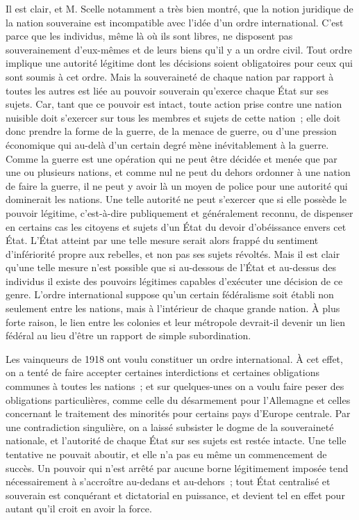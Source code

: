 \documentclass[french,twoside]{book} %
\begin{document}
Il est clair, et M. Scelle notamment a très bien montré, que la notion juridique de la nation souveraine est incompatible avec l'idée d'un ordre inter­national. C'est parce que les individus, même là où ils sont libres, ne disposent pas souverainement d'eux-mêmes et de leurs biens qu'il y a un ordre civil. Tout ordre implique une autorité légitime dont les décisions soient obliga­toires pour ceux qui sont soumis à cet ordre. Mais la souveraineté de chaque nation par rapport à toutes les autres est liée au pouvoir souverain qu'exerce chaque État sur ses sujets. Car, tant que ce pouvoir est intact, toute action prise contre une nation nuisible doit s'exercer sur tous les membres et sujets de cette nation ; elle doit donc prendre la forme de la guerre, de la menace de guerre, ou d'une pression économique qui au-delà d'un certain degré mène inévitablement à la guerre. Comme la guerre est une opération qui ne peut être décidée et menée que par une ou plusieurs nations, et comme nul ne peut du dehors ordonner à une nation de faire la guerre, il ne peut y avoir là un moyen de police pour une autorité qui dominerait les nations. Une telle autorité ne peut s'exercer que si elle possède le pouvoir légitime, c'est-à-dire publique­ment et généralement reconnu, de dispenser en certains cas les citoyens et sujets d'un État du devoir d'obéissance envers cet État. L'État atteint par une telle mesure serait alors frappé du sentiment d'infériorité propre aux rebelles, et non pas ses sujets révoltés. Mais il est clair qu'une telle mesure n'est possible que si au-dessous de l'État et au-dessus des individus il existe des pouvoirs légitimes capables d'exécuter une décision de ce genre. L'ordre international suppose qu'un certain fédéralisme soit établi non seulement entre les nations, mais à l'intérieur de chaque grande nation. À plus forte raison, le lien entre les colonies et leur métropole devrait-il devenir un lien fédéral au lieu d'être un rapport de simple subordination.\par
Les vainqueurs de 1918 ont voulu constituer un ordre international. À cet effet, on a tenté de faire accepter certaines interdictions et certaines obliga­tions communes à toutes les nations ; et sur quelques-unes on a voulu faire peser des obligations particulières, comme celle du désarmement pour l'Alle­magne et celles concernant le traitement des minorités pour certains pays d'Europe centrale. Par une contradiction singulière, on a laissé subsister le dogme de la souveraineté nationale, et l'autorité de chaque État sur ses sujets est restée intacte. Une telle tentative ne pouvait aboutir, et elle n'a pas eu même un commencement de succès. Un pouvoir qui n'est arrêté par aucune borne légitimement imposée tend nécessairement à s'accroître au-dedans et au-dehors ; tout État centralisé et souverain est conquérant et dictatorial en puissance, et devient tel en effet pour autant qu'il croit en avoir la force.\par
\end{document}
